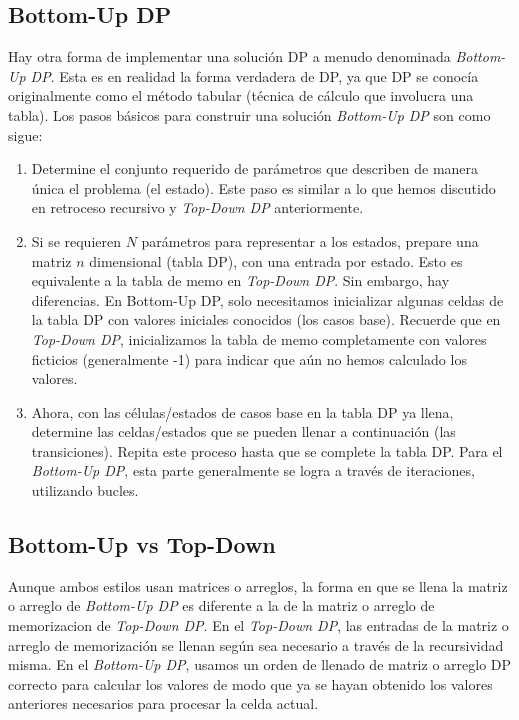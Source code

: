 \subsection{Bottom-Up DP}

Hay otra forma de implementar una solución DP a menudo denominada \emph{Bottom-Up DP}. Esta es en realidad la forma verdadera de DP, ya que DP se conocía originalmente como el método tabular (técnica de cálculo que involucra una tabla). Los pasos básicos para construir una solución \emph{Bottom-Up DP}
son como sigue:

\begin{enumerate}
	\item Determine el conjunto requerido de parámetros que describen de manera única el problema (el estado). Este paso es similar a lo que hemos discutido en retroceso recursivo y \emph{Top-Down DP} anteriormente.
	\item Si se requieren $N$ parámetros para representar a los estados, prepare una matriz $n$ dimensional (tabla DP), con una entrada por estado. Esto es equivalente a la tabla de memo en \emph{Top-Down DP}. Sin embargo, hay diferencias. En Bottom-Up DP, solo necesitamos inicializar algunas celdas de la tabla DP con valores iniciales conocidos (los casos base). Recuerde que en \emph{Top-Down DP}, inicializamos la tabla de memo completamente con valores ficticios (generalmente -1) para indicar que aún no hemos calculado los valores.
	\item Ahora, con las células/estados de casos base en la tabla DP ya llena, determine las celdas/estados que se pueden llenar a continuación (las transiciones). Repita este proceso hasta que se complete la tabla DP. Para el \emph{Bottom-Up DP}, esta parte generalmente se logra a través de iteraciones, utilizando bucles.
\end{enumerate}


\subsection{Bottom-Up vs Top-Down}

Aunque ambos estilos usan matrices o arreglos, la forma en que se llena la matriz o arreglo de \emph{Bottom-Up DP} es diferente a la de la matriz o arreglo de memorizacion de \emph{Top-Down DP}. En el \emph{Top-Down DP}, las entradas de la matriz o arreglo de memorización se llenan según sea necesario a través de la recursividad misma. En el \emph{Bottom-Up DP}, usamos un orden de llenado de matriz o arreglo DP correcto para calcular los valores de modo que ya se hayan obtenido los valores anteriores necesarios para procesar la celda actual. 

